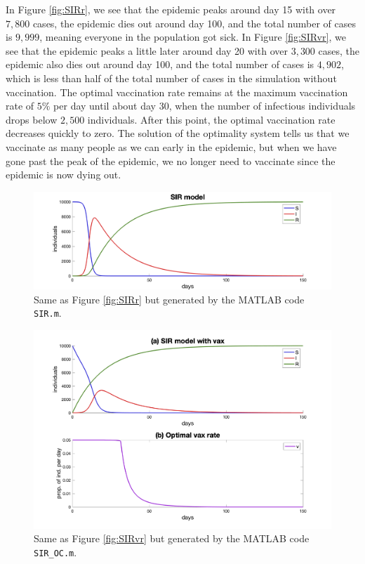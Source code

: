 \documentclass[12pt]{article}
\begin{document}
In Figure \ref{fig:SIRr}, we see that the epidemic peaks around day 15 with over $7,800$ cases, the epidemic dies out around day 100, and the total number of cases is $9,999$, meaning everyone in the population got sick. In Figure \ref{fig:SIRvr}, we see that the epidemic peaks a little later around day 20 with over $3,300$ cases, the epidemic also dies out around day 100, and the total number of cases is $4,902$, which is less than half of the total number of cases in the simulation without vaccination. The optimal vaccination rate remains at the maximum vaccination rate of $5\%$ per day until about day 30, when the number of infectious individuals drops below $2,500$ individuals. After this point, the optimal vaccination rate decreases quickly to zero. The solution of the optimality system tells us that we vaccinate as many people as we can early in the epidemic, but when we have gone past the peak of the epidemic, we no longer need to vaccinate since the epidemic is now dying out. 

\begin{figure}[H] 
	\centering
	\includegraphics[scale=0.25]{SIRm.png}
	\caption{Same as Figure \ref{fig:SIRr} but generated by the MATLAB code \texttt{SIR.m}.}
	\label{fig:SIRm}
\end{figure}

\begin{figure}[H] 
	\centering
	\includegraphics[scale=0.25]{SIRvm.png}
	\caption{Same as Figure \ref{fig:SIRvr} but generated by the MATLAB code \texttt{SIR\_OC.m}.}
	\label{fig:SIRvm}
\end{figure}



\end{document}
